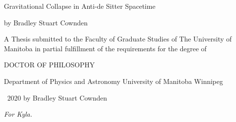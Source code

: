 \documentclass[12pt, a4paper]{report} %
\numberwithin{equation}{chapter}
\begin{document}
\setcounter{secnumdepth}{4}


\begin{titlepage}
\begin{center}
\vspace*{1.5cm}

{\Large Gravitational Collapse in Anti-de Sitter Spacetime}

\vspace{1.5cm}
 
by \linebreak
Bradley Stuart Cownden
\vspace{1.5cm}

A Thesis submitted to the Faculty of Graduate Studies of \linebreak
The University of Manitoba \linebreak 
in partial fulfillment of the requirements for the degree of

\vspace{1.5cm}

DOCTOR OF PHILOSOPHY

\vspace{1.5cm}

Department of Physics and Astronomy \linebreak
University of Manitoba \linebreak
Winnipeg

\vspace{1.5cm}

\textcopyright \, 2020 by Bradley Stuart Cownden
\end{center}
\end{titlepage}



\newpage
\vspace*{\fill}
\begin{center}
{\it For Kyla.}
\end{center}
\vspace*{\fill}
\clearpage

\newpage


\vspace*{\fill}
\end{document}
